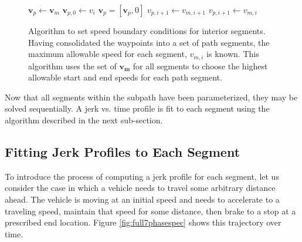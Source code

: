 \documentclass[letterpaper, 10 pt, conference]{ieeeconf}  %
\begin{document}
\begin{figure}
  \begin{algorithmic}[1]
      \State $\mathbf{v}_p \gets \mathbf{v}_m$ 
      \State $\mathbf{v}_{p,0} \gets v_i$ 
      \State $\mathbf{v}_p = [\mathbf{v}_p, 0]$ 
          \State $v_{p,i+1} \gets v_{m,i+1}$
        \Else
          \State $v_{p,i+1} \gets v_{m,i}$
        \EndIf
      \EndFor
    \EndProcedure
  \end{algorithmic}
  \caption{
    Algorithm to set speed boundary conditions for interior segments.
    Having consolidated the waypoints into a set of path segments, the maximum allowable speed for each segment, $v_{m,i}$ is known.
    This algorithm uses the set of $\mathbf{v_{m}}$ for all segments to choose the highest allowable start and end speeds for each path segment.
  }
\label{alg:segmentspeedboundaryconditions}
\end{figure}

Now that all segments within the subpath have been parameterized, they may be solved sequentially.
A jerk vs. time profile is fit to each segment using the algorithm described in the next sub-section.


\subsection{Fitting Jerk Profiles to Each Segment} \label{sec:jerkprofiles}

To introduce the process of computing a jerk profile for each segment, let us consider the case in which a vehicle needs to travel some arbitrary distance ahead.
The vehicle is moving at an initial speed and needs to accelerate to a traveling speed, maintain that speed for some distance, then brake to a stop at a prescribed end location.
Figure \ref{fig:full7phasespec} shows this trajectory over time.
\end{document}
